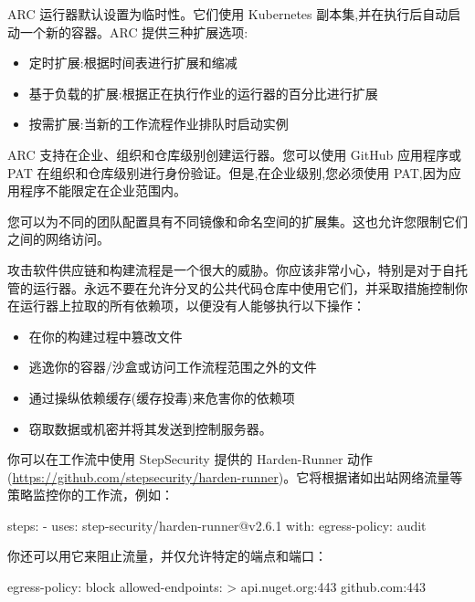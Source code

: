 
ARC 运行器默认设置为临时性。它们使用 Kubernetes 副本集,并在执行后自动启动一个新的容器。ARC 提供三种扩展选项:

\begin{itemize}
\item 
定时扩展:根据时间表进行扩展和缩减

\item 
基于负载的扩展:根据正在执行作业的运行器的百分比进行扩展

\item 
按需扩展:当新的工作流程作业排队时启动实例
\end{itemize}

ARC 支持在企业、组织和仓库级别创建运行器。您可以使用 GitHub 应用程序或 PAT 在组织和仓库级别进行身份验证。但是,在企业级别,您必须使用 PAT,因为应用程序不能限定在企业范围内。

您可以为不同的团队配置具有不同镜像和命名空间的扩展集。这也允许您限制它们之间的网络访问。


攻击软件供应链和构建流程是一个很大的威胁。你应该非常小心，特别是对于自托管的运行器。永远不要在允许分叉的公共代码仓库中使用它们，并采取措施控制你在运行器上拉取的所有依赖项，以便没有人能够执行以下操作：

\begin{itemize}
\item 
在你的构建过程中篡改文件

\item 
逃逸你的容器/沙盒或访问工作流程范围之外的文件

\item 
通过操纵依赖缓存(缓存投毒)来危害你的依赖项 

\item 
窃取数据或机密并将其发送到控制服务器。
\end{itemize}

你可以在工作流中使用 StepSecurity 提供的 Harden-Runner 动作(\url{https://github.com/stepsecurity/harden-runner})。它将根据诸如出站网络流量等策略监控你的工作流，例如：

\begin{shell}
steps:
  - uses: step-security/harden-runner@v2.6.1
    with:
      egress-policy: audit
\end{shell}

你还可以用它来阻止流量，并仅允许特定的端点和端口：

\begin{shell}
egress-policy: block
allowed-endpoints: >
  api.nuget.org:443
  github.com:443
\end{shell}

